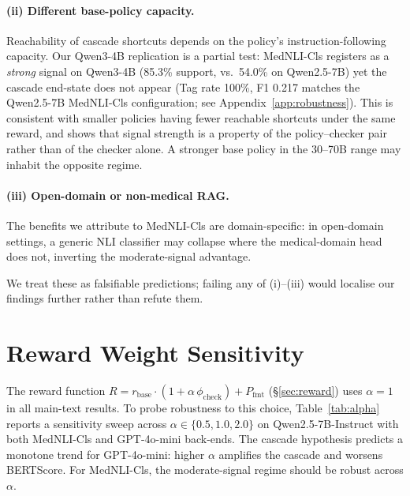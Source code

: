 \documentclass[11pt]{article}
\begin{document}
\paragraph{(ii) Different base-policy capacity.}
Reachability of cascade shortcuts depends on the policy's instruction-following capacity. Our
Qwen3-4B replication is a partial test: MedNLI-Cls registers as a \emph{strong} signal on
Qwen3-4B (85.3\% support, vs.\ 54.0\% on Qwen2.5-7B) yet the cascade end-state does not appear (Tag rate 100\%, F1 0.217 matches the Qwen2.5-7B MedNLI-Cls configuration; see Appendix~\ref{app:robustness}).
This is consistent with smaller policies having fewer reachable shortcuts under the same reward, and shows that signal strength is a property of the policy--checker pair rather than of the checker alone. A stronger base policy in the 30--70B range may inhabit the opposite regime.

\paragraph{(iii) Open-domain or non-medical RAG.}
The benefits we attribute to MedNLI-Cls are domain-specific: in open-domain settings, a generic
NLI classifier may collapse where the medical-domain head does not, inverting the moderate-signal
advantage.

We treat these as falsifiable predictions; failing any of (i)--(iii) would localise our findings further rather than refute them.
\section{Reward Weight Sensitivity}
\label{app:alpha}

The reward function $R = r_{\text{base}}\cdot(1+\alpha\,\phi_{\text{check}}) + P_{\text{fmt}}$ (\S\ref{sec:reward}) uses $\alpha=1$ in all main-text results. To probe robustness to this choice, Table~\ref{tab:alpha} reports a sensitivity sweep across $\alpha \in \{0.5, 1.0, 2.0\}$
on Qwen2.5-7B-Instruct with both MedNLI-Cls and
GPT-4o-mini back-ends.
The cascade hypothesis predicts a monotone trend for
GPT-4o-mini: higher $\alpha$ amplifies the cascade and
worsens BERTScore.
For MedNLI-Cls, the moderate-signal regime
should be robust across $\alpha$.
\end{document}
